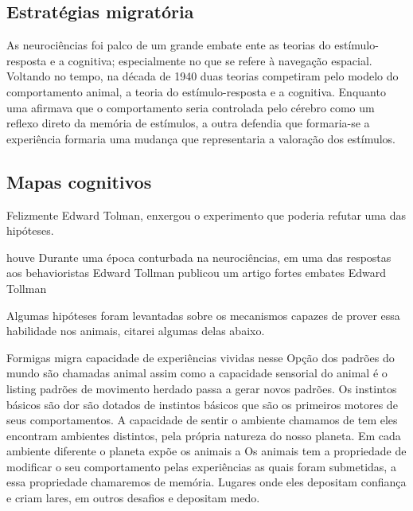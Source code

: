 \subsection{Estratégias migratória}

As neurociências foi palco de um grande embate ente as teorias do estímulo-resposta e a cognitiva; especialmente no que se refere à navegação espacial.
Voltando no tempo, na década de 1940 duas teorias competiram pelo modelo do comportamento animal, a teoria do estímulo-resposta e a cognitiva.
Enquanto uma afirmava que o comportamento seria controlada pelo cérebro como um reflexo direto da memória de estímulos, a outra defendia que formaria-se a experiência formaria uma mudança que representaria a valoração dos estímulos.

\subsection{Mapas cognitivos}
Felizmente Edward Tolman, enxergou o experimento que poderia refutar uma das hipóteses.\

houve Durante uma época conturbada na neurociências, em uma das respostas aos behavioristas Edward Tollman publicou um artigo  fortes embates Edward Tollman 

Algumas hipóteses foram levantadas sobre os mecanismos capazes de prover essa habilidade nos animais, citarei algumas delas abaixo.



Formigas
migra
capacidade de 
experiências vividas nesse 
Opção dos padrões do mundo são chamadas
animal assim como a capacidade sensorial do animal é o listing 
padrões de movimento herdado passa a gerar novos padrões.
Os instintos básicos são dor
são dotados de instintos básicos que são os primeiros motores de seus comportamentos.
A capacidade de sentir o ambiente chamamos de tem eles encontram ambientes distintos, pela própria natureza do nosso planeta.
Em cada ambiente diferente o planeta expõe os animais a
Os animais tem a propriedade de modificar o seu comportamento pelas experiências as quais foram submetidas, a essa propriedade chamaremos de memória.
Lugares onde eles depositam confiança e criam lares, em outros desafios e depositam medo.


